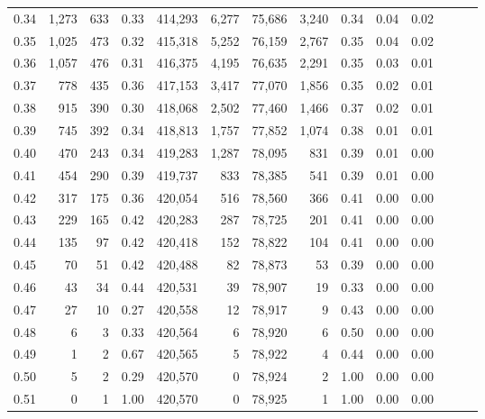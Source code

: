 \begin{tabular}{rrrrrrrrrrrrrr}
0.34 &   1,273 &    633 &  0.33 &  414,293 &    6,277 &  75,686 &   3,240 &  0.34 &  0.04 &      0.02 \\
0.35 &   1,025 &    473 &  0.32 &  415,318 &    5,252 &  76,159 &   2,767 &  0.35 &  0.04 &      0.02 \\
0.36 &   1,057 &    476 &  0.31 &  416,375 &    4,195 &  76,635 &   2,291 &  0.35 &  0.03 &      0.01 \\
0.37 &     778 &    435 &  0.36 &  417,153 &    3,417 &  77,070 &   1,856 &  0.35 &  0.02 &      0.01 \\
0.38 &     915 &    390 &  0.30 &  418,068 &    2,502 &  77,460 &   1,466 &  0.37 &  0.02 &      0.01 \\
0.39 &     745 &    392 &  0.34 &  418,813 &    1,757 &  77,852 &   1,074 &  0.38 &  0.01 &      0.01 \\
0.40 &     470 &    243 &  0.34 &  419,283 &    1,287 &  78,095 &     831 &  0.39 &  0.01 &      0.00 \\
0.41 &     454 &    290 &  0.39 &  419,737 &      833 &  78,385 &     541 &  0.39 &  0.01 &      0.00 \\
0.42 &     317 &    175 &  0.36 &  420,054 &      516 &  78,560 &     366 &  0.41 &  0.00 &      0.00 \\
0.43 &     229 &    165 &  0.42 &  420,283 &      287 &  78,725 &     201 &  0.41 &  0.00 &      0.00 \\
0.44 &     135 &     97 &  0.42 &  420,418 &      152 &  78,822 &     104 &  0.41 &  0.00 &      0.00 \\
0.45 &      70 &     51 &  0.42 &  420,488 &       82 &  78,873 &      53 &  0.39 &  0.00 &      0.00 \\
0.46 &      43 &     34 &  0.44 &  420,531 &       39 &  78,907 &      19 &  0.33 &  0.00 &      0.00 \\
0.47 &      27 &     10 &  0.27 &  420,558 &       12 &  78,917 &       9 &  0.43 &  0.00 &      0.00 \\
0.48 &       6 &      3 &  0.33 &  420,564 &        6 &  78,920 &       6 &  0.50 &  0.00 &      0.00 \\
0.49 &       1 &      2 &  0.67 &  420,565 &        5 &  78,922 &       4 &  0.44 &  0.00 &      0.00 \\
0.50 &       5 &      2 &  0.29 &  420,570 &        0 &  78,924 &       2 &  1.00 &  0.00 &      0.00 \\
0.51 &       0 &      1 &  1.00 &  420,570 &        0 &  78,925 &       1 &  1.00 &  0.00 &      0.00 \\

\end{tabular}
